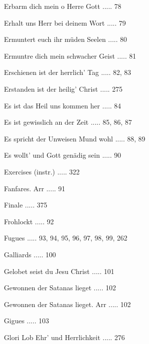 \documentclass[twocolumn]{book}
\begin{document}
\newline 
Erbarm dich mein o Herre Gott ..... 78

\newline 
Erhalt uns Herr bei deinem Wort ..... 79

\newline 
Ermuntert euch ihr müden Seelen ..... 80

\newline 
Ermuntre dich mein schwacher Geist ..... 81

\newline 
Erschienen ist der herrlich' Tag ..... 82, 83

\newline 
Erstanden ist der heilig' Christ ..... 275

\newline 
Es ist das Heil uns kommen her ..... 84

\newline 
Es ist gewisslich an der Zeit ..... 85, 86, 87

\newline 
Es spricht der Unweisen Mund wohl ..... 88, 89

\newline 
Es wollt' und Gott genädig sein ..... 90

\newline 
Exercises (instr.) ..... 322

\newline 
Fanfares. Arr ..... 91

\newline 
Finale ..... 375

\newline 
Frohlockt ..... 92

\newline 
Fugues ..... 93, 94, 95, 96, 97, 98, 99, 262

\newline 
Galliards ..... 100

\newline 
Gelobet seist du Jesu Christ ..... 101

\newline 
Gewonnen der Satanas lieget ..... 102

\newline 
Gewonnen der Satanas lieget. Arr ..... 102

\newline 
Gigues ..... 103

\newline 
Glori Lob Ehr' und Herrlichkeit ..... 276
\end{document}
